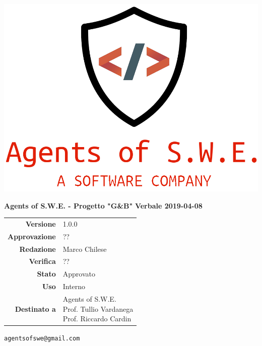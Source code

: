 


\begin{titlepage}
\thispagestyle{empty}

\begin{center}

\includegraphics[scale=0.3]{./images/logo.png} 




\large \textbf{Agents of S.W.E. - Progetto "G\&B"}
\vfill
\Huge \textbf{Verbale 2019-04-08}
\vfill
\large
\renewcommand{\arraystretch}{1.3}
\begin{tabular}{r|l}
\textbf{Versione} & 1.0.0\\
\textbf{Approvazione} & {??}\\
\textbf{Redazione} & \parbox[t]{5cm}{Marco Chilese}\\
\textbf{Verifica} & \parbox[t]{5cm}{??}\\
\textbf{Stato} & Approvato\\
\textbf{Uso} & Interno\\
\textbf{Destinato a} & \parbox[t]{5cm}{Agents of S.W.E. \\Prof. Tullio Vardanega\\Prof. Riccardo Cardin}
\end{tabular}
\vfill
\small
\texttt{agentsofswe@gmail.com}
\end{center}
\end{titlepage}

\pagebreak



\pagebreak


\pagebreak


\pagebreak









